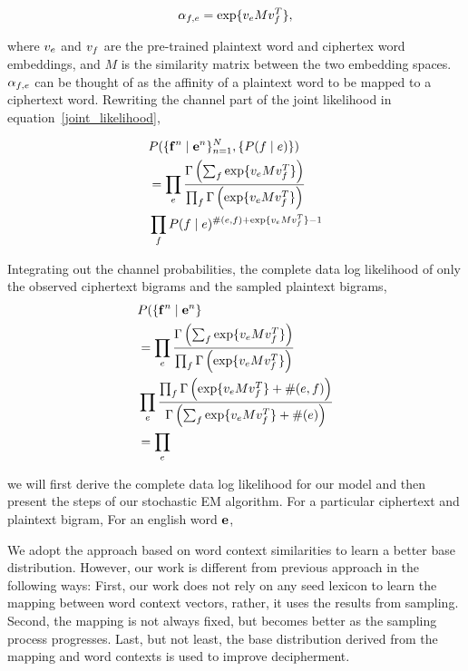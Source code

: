 \begin{equation}
\alpha_{f,e} = \exp \{ v_{e}  M  v_{f}^T \},
\end{equation}

where $v_{e}$ and $v_{f}$ are the pre-trained plaintext word and ciphertex word embeddings, and $M$ is the similarity matrix between the two embedding spaces. $\alpha_{f,e}$ can be thought of as the affinity of a plaintext word to be mapped to a ciphertext word. Rewriting the channel part of the joint likelihood in equation~\ref{joint_likelihood}, 

\begin{align*}
&P( \{ \mathbf{f}^n \mid \mathbf{e}^n \}_{n=1}^{N}, \{ P(f \mid e) \})  \\
&=\prod_{e}  \frac{\Gamma \left( \sum_{f} \exp \{ v_{e}  M  v_{f}^T \}  \right)} {\prod_{f} \Gamma \left( \exp \{ v_{e}  M  v_{f}^T \} \right)} \\
& \prod_{f} P(f \mid e)^{\#(e,f)+ \exp \{ v_{e}  M  v_{f}^T \} -1} 
\end{align*}

Integrating out the channel probabilities, the complete data log likelihood of only the observed ciphertext bigrams and the sampled plaintext bigrams,
\begin{align}
&P( \{ \mathbf{f}^n \mid \mathbf{e}^n \} \\
&= \prod_{e}  \frac{\Gamma \left( \sum_{f} \exp \{ v_{e}  M  v_{f}^T \}  \right)} {\prod_{f} \Gamma \left( \exp \{ v_{e}  M  v_{f}^T \} \right)} \\
& \prod_{e}  \frac{\prod_{f} \Gamma \left( \exp \{ v_{e}  M  v_{f}^T \} + \#(e,f) \right)} {\Gamma \left( \sum_{f} \exp \{ v_{e}  M  v_{f}^T \} + \#(e) \right)} \\
& =  \prod_{e} \frac{}{}
\end{align}

we will first derive the complete data log likelihood for our model and then present the steps of our stochastic EM algorithm. For a particular ciphertext and plaintext bigram, For an english word $\mathbf{e}$, 

We adopt the approach based on word context similarities to learn a better base distribution. However, our work is different from previous approach in the following ways: First, our work does not rely on any seed lexicon to learn the mapping between word context vectors, rather, it uses the results from sampling. Second, the mapping is not always fixed, but becomes better as the sampling process progresses. Last, but not least, the base distribution derived from the mapping and word contexts is used to improve decipherment.

